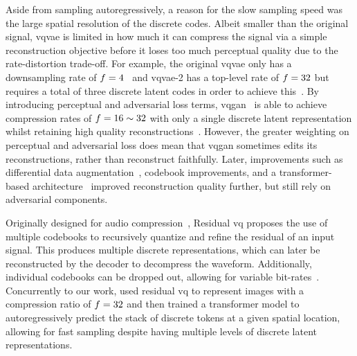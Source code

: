 Aside from sampling autoregressively, a reason for the slow sampling speed was
the large spatial resolution of the discrete codes. Albeit smaller than the
original signal, \gls{vqvae} is limited in how much it can compress the signal
via a simple reconstruction objective before it loses too much perceptual
quality due to the rate-distortion trade-off. For example, the original
\gls{vqvae} only has a downsampling rate of
$f=4$~\cite{oord2017vqvae} and \gls{vqvae}-2 has a top-level rate
of $f=32$ but requires a total of three discrete latent codes in
order to achieve this~\cite{razavi2019generating}. By introducing perceptual and
adversarial loss terms, \gls{vqgan}~\cite{esser2021taming} is able to achieve
compression rates of $f=16 \sim 32$ with only a single discrete
latent representation whilst retaining high quality
reconstructions~\cite{esser2021taming}. However, the greater weighting on
perceptual and adversarial loss does mean that \gls{vqgan} sometimes edits its
reconstructions, rather than reconstruct faithfully. Later, improvements such as
differential data augmentation~\cite{bondtaylor2021unleashing}, codebook
improvements, and a transformer-based architecture~\cite{yu2021vqgan} improved
reconstruction quality further, but still rely on adversarial components.

Originally designed for audio compression~\cite{zeghidour2021soundstream},
Residual \gls{vq} proposes the use of multiple codebooks to recursively quantize
and refine the residual of an input signal. This produces multiple discrete
representations, which can later be reconstructed by the decoder to decompress
the waveform. Additionally, individual codebooks can be dropped out, allowing
for variable bit-rates~\cite{zeghidour2021soundstream}. Concurrently to our
work, \citet{lee2022rqvae} used residual \gls{vq} to represent images with a
compression ratio of $f=32$ and then trained a transformer model
to autoregressively predict the stack of discrete tokens at a given spatial
location, allowing for fast sampling despite having multiple levels of discrete
latent representations\cite{lee2022rqvae}.


